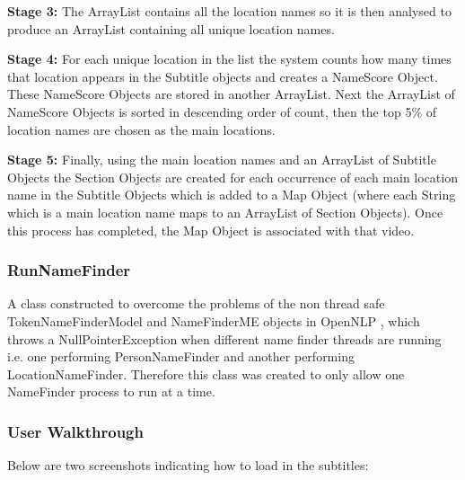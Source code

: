 \textbf{Stage 3:} The ArrayList contains all the location names so it is then analysed to produce an ArrayList containing all unique location names.

\textbf{Stage 4:} For each unique location in the list the system counts how many times that location appears in the Subtitle objects and creates a 
NameScore Object. These NameScore Objects are stored in another ArrayList. Next the ArrayList of NameScore Objects is sorted in descending order of 
count, then the top 5\% of location names are chosen as the main locations. 

\textbf{Stage 5:} Finally, using the main location names and an ArrayList of Subtitle Objects the Section Objects are created for each occurrence of 
each main location name in the Subtitle Objects which is added to a Map Object (where each String which is a main location name maps to an ArrayList of Section Objects). 
Once this process has completed, the Map Object is associated with that video.

\subsubsection{RunNameFinder}
A class constructed to overcome the problems of the non thread safe TokenNameFinderModel and NameFinderME objects in OpenNLP \cite{nlp}, which throws a NullPointerException when different name finder threads are running i.e. one performing PersonNameFinder and another performing LocationNameFinder. Therefore this class was created to only allow one NameFinder process to run at a time.

\newpage 
\subsubsection{User Walkthrough}
Below are two screenshots indicating how to load in the subtitles:

